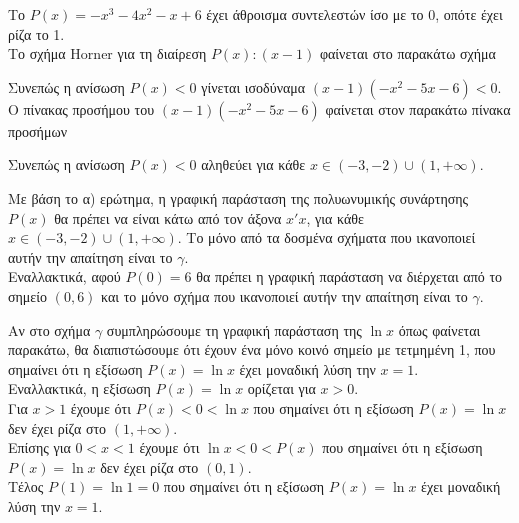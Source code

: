 \begin{alist}
\item Το $P(x) = -x^3 - 4x^2 - x + 6$ έχει άθροισμα συντελεστών ίσο με το 0, οπότε έχει ρίζα το 1. \\
Το σχήμα Horner για τη διαίρεση $P(x) : (x-1)$ φαίνεται στο παρακάτω σχήμα
\begin{center}
\end{center}
Συνεπώς η ανίσωση $P(x) < 0$ γίνεται ισοδύναμα $(x-1)(-x^2 - 5x - 6) < 0$. \\
Ο πίνακας προσήμου του $(x-1)(-x^2 - 5x - 6)$ φαίνεται στον παρακάτω πίνακα προσήμων
\begin{center}
\end{center}
Συνεπώς η ανίσωση $P(x) < 0$ αληθεύει για κάθε $x \in (-3, -2) \cup (1, +\infty)$.
\item Με βάση το α) ερώτημα, η γραφική παράσταση της πολυωνυμικής συνάρτησης $P(x)$ θα πρέπει να είναι κάτω από τον άξονα $x'x$, για κάθε $x \in (-3, -2) \cup (1, +\infty)$. Το μόνο από τα δοσμένα σχήματα που ικανοποιεί αυτήν την απαίτηση είναι το $\gamma$. \\
Εναλλακτικά, αφού $P(0) = 6$ θα πρέπει η γραφική παράσταση να διέρχεται από το σημείο $(0,6)$ και το μόνο σχήμα που ικανοποιεί αυτήν την απαίτηση είναι το $\gamma$.
\item Αν στο σχήμα $\gamma$ συμπληρώσουμε τη γραφική παράσταση της $\ln x$ όπως φαίνεται παρακάτω, θα διαπιστώσουμε ότι έχουν ένα μόνο κοινό σημείο με τετμημένη 1, που σημαίνει ότι η εξίσωση $P(x) = \ln x$ έχει μοναδική λύση την $x = 1$. \\
Εναλλακτικά, η εξίσωση $P(x) = \ln x$ ορίζεται για $x > 0$. \\
Για $x > 1$ έχουμε ότι $P(x) < 0 < \ln x$ που σημαίνει ότι η εξίσωση $P(x) = \ln x$ δεν έχει ρίζα στο $(1, +\infty)$. \\
Επίσης για $0 < x < 1$ έχουμε ότι $\ln x < 0 < P(x)$ που σημαίνει ότι η εξίσωση $P(x) = \ln x$ δεν έχει ρίζα στο $(0, 1)$. \\
Τέλος $P(1) = \ln 1 = 0$ που σημαίνει ότι η εξίσωση $P(x) = \ln x$ έχει μοναδική λύση την $x = 1$.
\end{alist}

